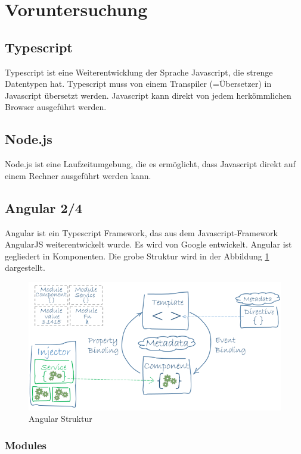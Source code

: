\section{Voruntersuchung}

\subsection{Typescript}
Typescript ist eine Weiterentwicklung der Sprache Javascript, die strenge Datentypen hat. Typescript muss von einem Transpiler (=Übersetzer) in Javascript übersetzt werden. Javascript kann direkt von jedem herkömmlichen Browser ausgeführt werden.
\subsection{Node.js}
Node.js ist eine Laufzeitumgebung, die es ermöglicht, dass Javascript direkt auf einem Rechner ausgeführt werden kann. 

\subsection{Angular 2/4}
Angular ist ein Typescript Framework, das aus dem Javascript-Framework AngularJS weiterentwickelt wurde. Es wird von Google entwickelt. Angular ist gegliedert in Komponenten. Die grobe Struktur wird in der Abbildung \ref{Angular Struktur} dargestellt.

\begin{figure}[H]
      \includegraphics[width=1\textwidth]{Bilder/Greistorfer/Angular.png}
      \caption{Angular Struktur}
      \label{Angular Struktur}
\end{figure}

\subsubsection{Modules}

